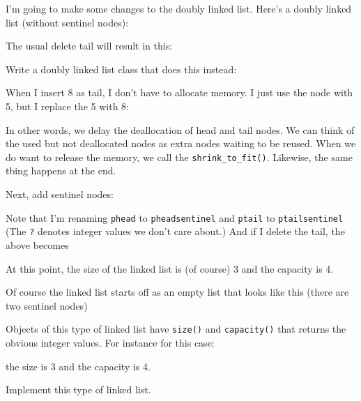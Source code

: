 I'm going to make some changes to the doubly linked list.
Here's a doubly linked list (without sentinel nodes):



The usual delete tail will result in this:



Write a doubly linked list class that does this instead:



When I insert 8 as tail, I don't have to allocate memory. I just use the node
with 5, but I replace the 5 with 8:



In other words, we delay the deallocation of head and tail nodes.
We can think of the used but not deallocated nodes as extra nodes
waiting to be reused.
When we do want to release the memory, we call the
\verb!shrink_to_fit()!.
Likewise, the same tbing happens at the end.

Next, add sentinel nodes:



Note that I'm renaming \texttt{phead} to 
\texttt{pheadsentinel}
and
\texttt{ptail}
to
\texttt{ptailsentinel}
(The \texttt{?} denotes integer values we don't care about.)
And if I delete the tail, the above becomes



At this point, the size of the linked list is (of course) 3
and the capacity is 4.

Of course the linked list starts off as an empty list
that looks like this (there are two sentinel nodes)



Objects of this type of linked list have
\texttt{size()} and \texttt{capacity()}
that returns the obvious integer values.
For instance for this case:



the size is 3 and the capacity is 4.

Implement this type of linked list.
